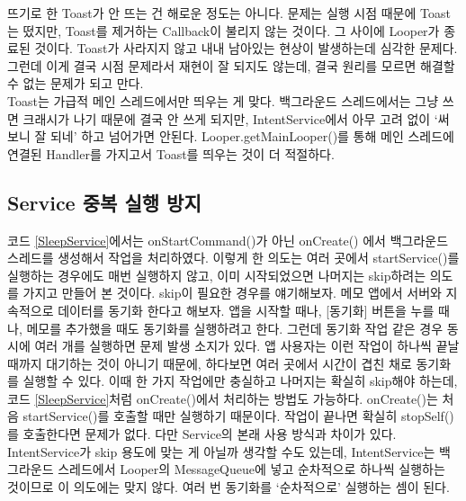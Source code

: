 뜨기로 한 Toast가 안 뜨는 건 해로운 정도는 아니다. 문제는 실행 시점 때문에 Toast는 떴지만, Toast를 제거하는 Callback이 불리지 않는 것이다. 그 사이에 Looper가 종료된 것이다.
Toast가 사라지지 않고 내내 남아있는 현상이 발생하는데 심각한 문제다. 그런데 이게 결국 시점 문제라서 재현이 잘 되지도 않는데, 결국 원리를 모르면 해결할 수 없는 문제가 되고 만다.\\

Toast는 가급적 메인 스레드에서만 띄우는 게 맞다. 백그라운드 스레드에서는 그냥 쓰면 크래시가 나기 때문에 결국 안 쓰게 되지만, IntentService에서 아무 고려 없이 `써보니 잘 되네' 하고 넘어가면 안된다. Looper.getMainLooper()를 통해 메인 스레드에 연결된 Handler를 가지고서 Toast를 띄우는 것이 더 적절하다.

\subsection{Service 중복 실행 방지}
코드 \ref{SleepService}에서는 onStartCommand()가 아닌 onCreate() 에서 백그라운드 스레드를 생성해서 작업을 처리하였다. 
이렇게 한 의도는 여러 곳에서 startService()를 실행하는 경우에도 매번 실행하지 않고, 이미 시작되었으면 나머지는 skip하려는 의도를 가지고 만들어 본 것이다.
skip이 필요한 경우를 얘기해보자. 
메모 앱에서 서버와 지속적으로 데이터를 동기화 한다고 해보자. 앱을 시작할 때나, [동기화] 버튼을 누를 때나, 메모를 추가했을 때도 동기화를 실행하려고 한다. 
그런데 동기화 작업 같은 경우 동시에 여러 개를 실행하면 문제 발생 소지가 있다. 
앱 사용자는 이런 작업이 하나씩 끝날 때까지 대기하는 것이 아니기 때문에, 하다보면 여러 곳에서 시간이 겹친 채로 동기화를 실행할 수 있다.
이때 한 가지 작업에만 충실하고 나머지는 확실히 skip해야 하는데, 코드 \ref{SleepService}처럼 onCreate()에서 처리하는 방법도 가능하다. 
onCreate()는 처음 startService()를 호출할 때만 실행하기 때문이다. 
작업이 끝나면 확실히 stopSelf()를 호출한다면 문제가 없다. 다만 Service의 본래 사용 방식과 차이가 있다.\\

IntentService가 skip 용도에 맞는 게 아닐까 생각할 수도 있는데, 
IntentService는 백그라운드 스레드에서 Looper의 MessageQueue에 넣고 순차적으로 하나씩 실행하는 것이므로 이 의도에는 맞지 않다. 여러 번 동기화를 `순차적으로' 실행하는 셈이 된다.\\


